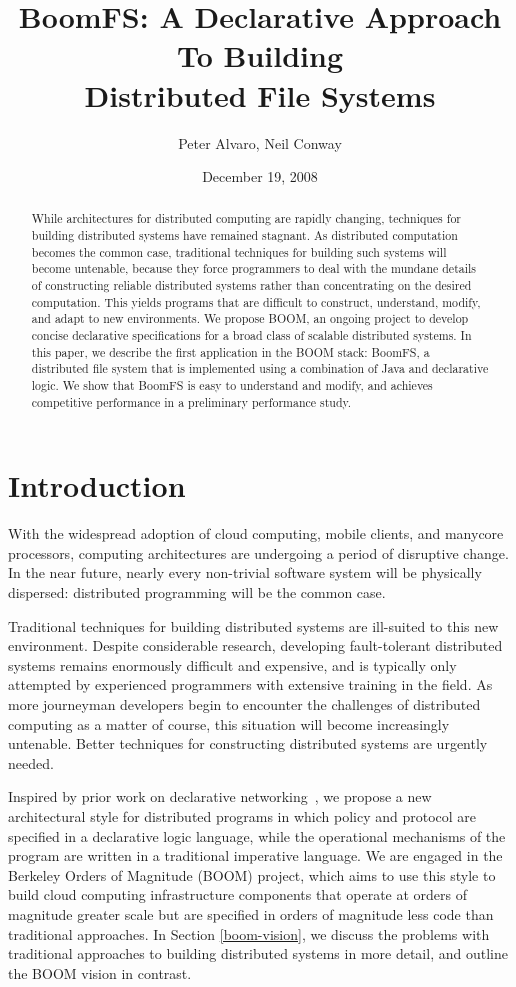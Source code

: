 \documentclass[twocolumn]{article}
\title{BoomFS: A Declarative Approach To Building\\Distributed File Systems}
\author{Peter Alvaro, Neil Conway}
\date{December 19, 2008}
\begin{document}
\maketitle
\begin{abstract}
  While architectures for distributed computing are rapidly changing,
  techniques for building distributed systems have remained
  stagnant. As distributed computation becomes the common case,
  traditional techniques for building such systems will become
  untenable, because they force programmers to deal with the mundane
  details of constructing reliable distributed systems rather than
  concentrating on the desired computation. This yields programs that
  are difficult to construct, understand, modify, and adapt to new
  environments. We propose BOOM, an ongoing project to develop concise
  declarative specifications for a broad class of scalable distributed
  systems. In this paper, we describe the first application in the
  BOOM stack: BoomFS, a distributed file system that is implemented
  using a combination of Java and declarative logic. We show that
  BoomFS is easy to understand and modify, and achieves competitive
  performance in a preliminary performance study.
\end{abstract}
\section{Introduction}
\label{introduction}
With the widespread adoption of cloud computing, mobile clients, and
manycore processors, computing architectures are undergoing a period
of disruptive change. In the near future, nearly every non-trivial
software system will be physically dispersed: distributed programming
will be the common case.

Traditional techniques for building distributed systems are ill-suited
to this new environment. Despite considerable research, developing
fault-tolerant distributed systems remains enormously difficult and
expensive, and is typically only attempted by experienced programmers
with extensive training in the field. As more journeyman developers
begin to encounter the challenges of distributed computing as a matter
of course, this situation will become increasingly untenable. Better
techniques for constructing distributed systems are urgently needed.

Inspired by prior work on declarative networking~\cite{dn-sigmod,
  network-data-indep}, we propose a new architectural style for
distributed programs in which policy and protocol are specified in a
declarative logic language, while the operational mechanisms of the
program are written in a traditional imperative language. We are
engaged in the Berkeley Orders of Magnitude (BOOM) project, which aims
to use this style to build cloud computing infrastructure components
that operate at orders of magnitude greater scale but are specified in
orders of magnitude less code than traditional approaches. In Section
\ref{boom-vision}, we discuss the problems with traditional approaches
to building distributed systems in more detail, and outline the BOOM
vision in contrast.
\end{document}
